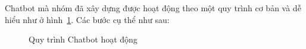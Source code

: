 \documentclass{article}
\numberwithin{equation}{section}
\numberwithin{equation}{section}
\begin{document}
Chatbot mà nhóm đã xây dựng được hoạt động theo một quy trình cơ bản và dễ hiểu như ở hình~\ref{fig:chatbot-pipeline}. Các bước cụ thể như sau:
\begin{figure}[!ht]
    \centering
    \caption{Quy trình Chatbot hoạt động}
    \label{fig:chatbot-pipeline}
\end{figure}
\end{document}
